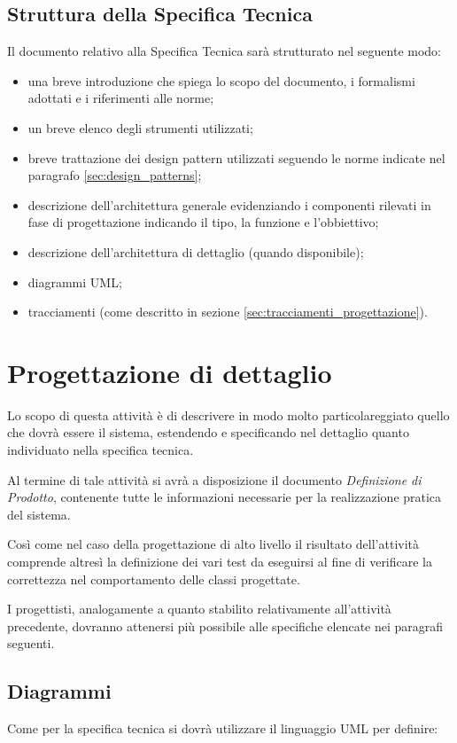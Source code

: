 {\subsection{Struttura della Specifica Tecnica}
Il documento relativo alla Specifica Tecnica sarà strutturato nel seguente modo:
\begin{itemize}
\item una breve introduzione che spiega lo scopo del documento, i formalismi adottati e i riferimenti alle norme;
\item un breve elenco degli strumenti utilizzati;
\item breve trattazione dei design pattern utilizzati seguendo le norme indicate nel paragrafo \ref{sec:design_patterns};
\item descrizione dell'architettura generale evidenziando i componenti rilevati in fase di progettazione indicando il tipo, la funzione e l'obbiettivo;
\item descrizione dell'architettura di dettaglio (quando disponibile);
\item diagrammi UML;
\item tracciamenti (come descritto in sezione \ref{sec:tracciamenti_progettazione}).
\end{itemize}

\section{Progettazione di dettaglio}
Lo scopo di questa attività è di descrivere in modo molto particolareggiato quello che dovrà essere il sistema, estendendo e specificando nel dettaglio quanto individuato nella specifica tecnica.

Al termine di tale attività si avrà a disposizione il documento \textit{Definizione di Prodotto}, contenente tutte le informazioni necessarie per la realizzazione pratica del sistema.

Così come nel caso della progettazione di alto livello il risultato dell'attività comprende altresì la definizione dei vari test da eseguirsi al fine di verificare la correttezza nel comportamento delle classi progettate.

I progettisti, analogamente a quanto stabilito relativamente all'attività precedente, dovranno attenersi più possibile alle specifiche elencate nei paragrafi seguenti.

\subsection{Diagrammi}
Come per la specifica tecnica si dovrà utilizzare il linguaggio UML per definire:

}
